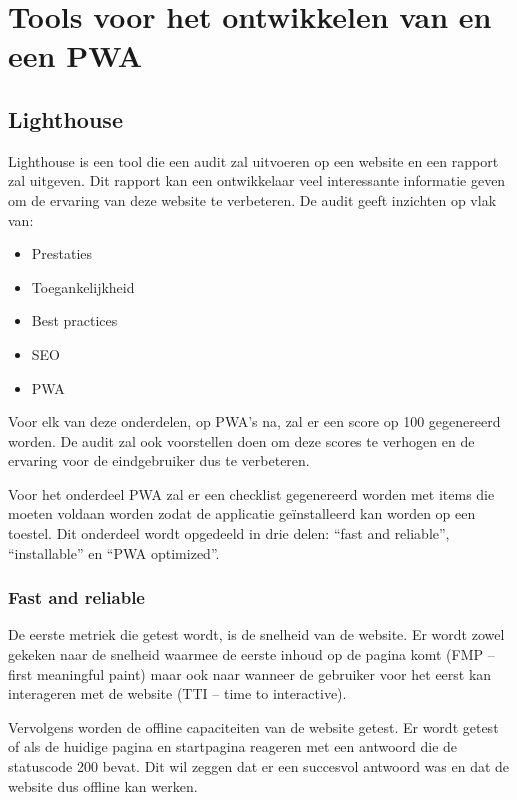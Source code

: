 \section{Tools voor het ontwikkelen van en een PWA}


\subsection{Lighthouse}

	Lighthouse is een tool die een audit zal uitvoeren op een website en een rapport zal uitgeven. Dit rapport kan een ontwikkelaar veel interessante informatie geven om de ervaring van deze website te verbeteren. De audit geeft inzichten op vlak van:
	
	\begin{itemize}
		\item	Prestaties
		\item	Toegankelijkheid
		\item	Best practices
		\item	SEO
		\item   PWA
	\end{itemize}
	
	\autocite{Lighthouse2020}
	
	Voor elk van deze onderdelen, op PWA’s na, zal er een score op 100 gegenereerd worden. De audit zal ook voorstellen doen om deze scores te verhogen en de ervaring voor de eindgebruiker dus te verbeteren.
	
	Voor het onderdeel PWA zal er een checklist gegenereerd worden met items die moeten voldaan worden zodat de applicatie geïnstalleerd kan worden op een toestel. Dit onderdeel wordt opgedeeld in drie delen: “fast and reliable”, “installable” en “PWA optimized”.
	
	
	\subsubsection{Fast and reliable}
		De eerste metriek die getest wordt, is de snelheid van de website. Er wordt zowel gekeken naar de snelheid waarmee de eerste inhoud op de pagina komt (FMP – first meaningful paint) maar ook naar wanneer de gebruiker voor het eerst kan interageren met de website (TTI – time to interactive).
		
		\autocite{web.dev2020}
		
		Vervolgens worden de offline capaciteiten van de website getest. Er wordt getest of als de huidige pagina en startpagina reageren met een antwoord die de statuscode 200 bevat. Dit wil zeggen dat er een succesvol antwoord was en dat de website dus offline kan werken.
	

